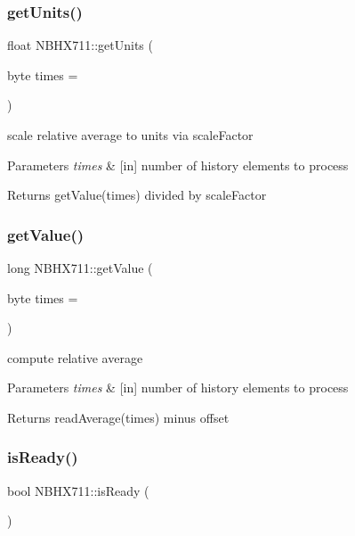 \subsubsection{\texorpdfstring{get\+Units()}{getUnits()}}
{\footnotesize\ttfamily float N\+B\+H\+X711\+::get\+Units (\begin{DoxyParamCaption}\item[{byte}]{times = {} }\end{DoxyParamCaption})}

scale relative average to units via scale\+Factor 
\begin{DoxyParams}{Parameters}
{\em times} & \mbox{[}in\mbox{]} number of history elements to process \\
\hline
\end{DoxyParams}
\begin{DoxyReturn}{Returns}
get\+Value(times) divided by scale\+Factor 
\end{DoxyReturn}
\mbox{\label{class_n_b_h_x711_aeca589479761846f5e96343dd7251578}} 
\subsubsection{\texorpdfstring{get\+Value()}{getValue()}}
{\footnotesize\ttfamily long N\+B\+H\+X711\+::get\+Value (\begin{DoxyParamCaption}\item[{byte}]{times = {} }\end{DoxyParamCaption})}

compute relative average 
\begin{DoxyParams}{Parameters}
{\em times} & \mbox{[}in\mbox{]} number of history elements to process \\
\hline
\end{DoxyParams}
\begin{DoxyReturn}{Returns}
read\+Average(times) minus offset 
\end{DoxyReturn}
\mbox{\label{class_n_b_h_x711_a97a82159c3ffd2314c94bf0905703eac}} 
\subsubsection{\texorpdfstring{is\+Ready()}{isReady()}}
{\footnotesize\ttfamily bool N\+B\+H\+X711\+::is\+Ready (\begin{DoxyParamCaption}{ }\end{DoxyParamCaption})\hspace{0.3cm}{\ttfamily [protected]}}

